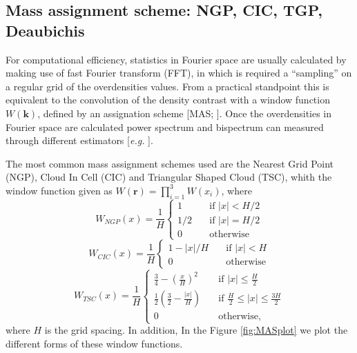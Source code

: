\documentclass[a4paper,fleqn,usenatbib]{mnras}
\begin{document}


\subsection{Mass assignment scheme: NGP, CIC, TGP, Deaubichis}
\label{sec:theory:MAS}


For computational efficiency, statistics in Fourier space are usually calculated 
by making use of fast Fourier transform (FFT), in which is required a 
``sampling'' on a regular grid of the overdensities values. From a practical 
standpoint this is equivalent to the convolution of the density contrast with a 
window function $W(\mathbf{k})$, defined by an assignation scheme [MAS; 
\cite{HockneyEastwood1981}]. Once the overdensities in Fourier space are  
calculated power spectrum and bispectrum can measured through different 
estimators [\textit{e.g.} \citet{Jeong2010,Scoccimarro1998}].

The most common mass assignment schemes used are the Nearest Grid Point (NGP),
Cloud In Cell (CIC) and Triangular Shaped Cloud (TSC), whith the window function 
given as $W(\mathbf{r})=\prod_{i=1}^3 W(x_i)$, where
\citep{HockneyEastwood1981}
\begin{equation}
  W_{NGP}(x) =\frac{1}{H}
  \begin{cases}
    1   & \quad \text{if } |x| < H/2\\
    1/2 & \quad \text{if } |x| = H/2\\
    0   & \quad \text{otherwise}
  \end{cases}
\end{equation}
\begin{equation}
  W_{CIC}(x) = \frac{1}{H}
  \begin{cases}
    1 - |x|/H & \quad \text{if } |x| < H\\
    0         & \quad \text{otherwise}
  \end{cases}
\end{equation}
\begin{equation}
  W_{TSC}(x)=\frac{1}{H}
  \begin{cases}
    \frac{3}{4} - \left(\frac{x}{H}\right)^2          & \quad \text{if } 
    |x| \leq \frac{H}{2}\\
    \frac{1}{2}\left(\frac{3}{2}-\frac{|x|}{H}\right) & \quad \text{if } 
    \frac{H}{2} \leq |x| \leq \frac{3H}{2}\\
    0                                                 & \quad \text{otherwise},
  \end{cases}
\end{equation}
where $H$ is the grid spacing. In addition, 
In the Figure \ref{fig:MASplot} we plot the different forms of these 
window functions.
\end{document}

